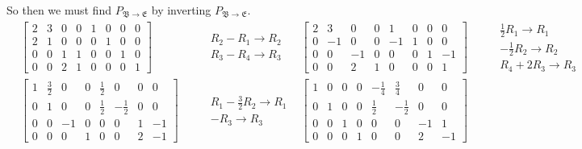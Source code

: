 \documentclass{report}
\begin{document}
So then we must find $P_{\mathfrak{B}\rightarrow\mathfrak{E}}$ by inverting $P_{\mathfrak{B}\rightarrow\mathfrak{E}}$.
\begin{align*}
	&\left[\begin{array}{cccc|cccc}
		2 & 3 & 0 & 0 & 1 & 0 & 0 & 0 \\
		2 & 1 & 0 & 0 & 0 & 1 & 0 & 0 \\
		0 & 0 & 1 & 1 & 0 & 0 & 1 & 0 \\
		0 & 0 & 2 & 1 & 0 & 0 & 0 & 1
	\end{array}\right]
	&& \begin{aligned} & R_2 - R_1 \rightarrow R_2 \\ & R_3 - R_4 \rightarrow R_3 \end{aligned}
	&\left[\begin{array}{cccc|cccc}
		2 & 3 & 0 & 0 & 1 & 0 & 0 & 0 \\
		0 & -1 & 0 & 0 & -1 & 1 & 0 & 0 \\
		0 & 0 & -1 & 0 & 0 & 0 & 1 & -1 \\
		0 & 0 & 2 & 1 & 0 & 0 & 0 & 1
	\end{array}\right]
	&& \begin{aligned} & \frac{1}{2}R_1 \rightarrow R_1 \\ & -\frac{1}{2}R_2 \rightarrow R_2 \\ & R_4 + 2R_3 \rightarrow R_3 \end{aligned} \\
	&\left[\begin{array}{cccc|cccc}
		1 & \frac{3}{2} & 0 & 0 & \frac{1}{2} & 0 & 0 & 0 \\
		0 & 1 & 0 & 0 & \frac{1}{2} & -\frac{1}{2} & 0 & 0 \\
		0 & 0 & -1 & 0 & 0 & 0 & 1 & -1 \\
		0 & 0 & 0 & 1 & 0 & 0 & 2 & -1
	\end{array}\right]
	&& \begin{aligned} &R_1 - \frac{3}{2}R_2 \rightarrow R_1 \\ & -R_3 \rightarrow R_3 \end{aligned}
	&\left[\begin{array}{cccc|cccc}
		1 & 0 & 0 & 0 & -\frac{1}{4} & \frac{3}{4} & 0 & 0 \\
		0 & 1 & 0 & 0 & \frac{1}{2} & -\frac{1}{2} & 0 & 0 \\
		0 & 0 & 1 & 0 & 0 & 0 & -1 & 1 \\
		0 & 0 & 0 & 1 & 0 & 0 & 2 & -1
	\end{array}\right]
\end{align*}
\end{document}
